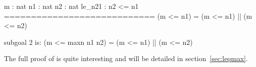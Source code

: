 \begin{coqout}{}{}
  m : nat
  n1 : nat
  n2 : nat
  le_n21 : n2 <= n1
  ============================
   (m <= n1) = (m <= n1) || (m <= n2)

subgoal 2 is:
 (m <= maxn n1 n2) = (m <= n1) || (m <= n2)
\end{coqout}

The full proof of  is quite interesting and will be
detailed in section~\ref{sec:leqmax}.






%
%




